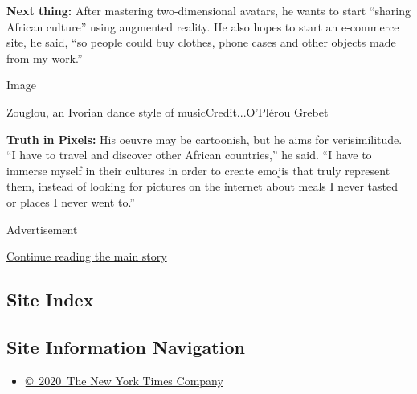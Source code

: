 \textbf{Next thing:} After mastering two-dimensional avatars, he wants
to start ``sharing African culture'' using augmented reality. He also
hopes to start an e-commerce site, he said, ``so people could buy
clothes, phone cases and other objects made from my work.''

Image

Zouglou, an Ivorian dance style of musicCredit...O'Plérou Grebet

\textbf{Truth in Pixels:} His oeuvre may be cartoonish, but he aims for
verisimilitude. ``I have to travel and discover other African
countries,'' he said. ``I have to immerse myself in their cultures in
order to create emojis that truly represent them, instead of looking for
pictures on the internet about meals I never tasted or places I never
went to.''

Advertisement

\protect\hyperlink{after-bottom}{Continue reading the main story}

\hypertarget{site-index}{%
\subsection{Site Index}\label{site-index}}

\hypertarget{site-information-navigation}{%
\subsection{Site Information
Navigation}\label{site-information-navigation}}

\begin{itemize}
\tightlist
\item
  \href{https://help.nytimes.com/hc/en-us/articles/115014792127-Copyright-notice}{©~2020~The
  New York Times Company}
\end{itemize}

